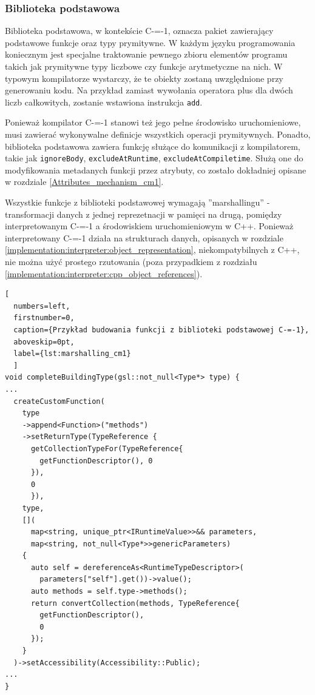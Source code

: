 \subsubsection{Biblioteka podstawowa}
\label{implementation:interpreter:basic_library}

Biblioteka podstawowa, w kontekście C-=-1, oznacza pakiet zawierający podstawowe funkcje oraz typy prymitywne.
W każdym języku programowania koniecznym jest specjalne traktowanie pewnego zbioru elementów programu takich jak prymitywne typy liczbowe czy funkcje arytmetyczne na nich.
W typowym kompilatorze wystarczy, że te obiekty zostaną uwzględnione przy generowaniu kodu.
Na przykład zamiast wywołania operatora plus dla dwóch liczb całkowitych, zostanie wstawiona instrukcja \lstinline{add}.

Ponieważ kompilator C-=-1 stanowi też jego pełne środowisko uruchomieniowe, musi zawierać wykonywalne definicje wszystkich operacji prymitywnych.
Ponadto, biblioteka podstawowa zawiera funkcję służące do komunikacji z kompilatorem, takie jak \lstinline{ignoreBody}, \lstinline{excludeAtRuntime}, \lstinline{excludeAtCompiletime}.
Służą one do modyfikowania metadanych funkcji przez atrybuty, co zostało dokładniej opisane w rozdziale \ref{Attributes_mechanism_cm1}.

Wszystkie funkcje z biblioteki podstawowej wymagają ''marshallingu'' - transformacji danych z jednej reprezetnacji w pamięci na drugą, pomiędzy interpretowanym C-=-1 a środowiskiem uruchomieniowym w C++.
Ponieważ interpretowany C-=-1 działa na strukturach danych, opisanych w rozdziale \ref{implementation:interpreter:object_representation}, niekompatybilnych z C++, nie można użyć prostego rzutowania (poza przypadkiem z rozdziału \ref{implementation:interpreter:cpp_object_references}).

\begin{minipage}{\linewidth}
\begin{lstlisting}[
  numbers=left,
  firstnumber=0,
  caption={Przykład budowania funkcji z biblioteki podstawowej C-=-1},
  aboveskip=0pt,
  label={lst:marshalling_cm1}
  ]
void completeBuildingType(gsl::not_null<Type*> type) {
...
  createCustomFunction(
    type
    ->append<Function>("methods")
    ->setReturnType(TypeReference {
      getCollectionTypeFor(TypeReference{
        getFunctionDescriptor(), 0 
      }),
      0 
      }),
    type,
    [](
      map<string, unique_ptr<IRuntimeValue>>&& parameters,
      map<string, not_null<Type*>>genericParameters)
    {
      auto self = dereferenceAs<RuntimeTypeDescriptor>(
        parameters["self"].get())->value();
      auto methods = self.type->methods();
      return convertCollection(methods, TypeReference{
        getFunctionDescriptor(),
        0
      });
    }
  )->setAccessibility(Accessibility::Public);
...
}
\end{lstlisting}
\end{minipage}

